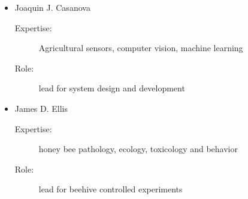 
\begin{itemize}
\item Joaquin J. Casanova
\begin{description}
\item[Expertise:] Agricultural sensors, computer vision, machine learning
\item[Role:] lead for system design and development
\end{description}
\item James D. Ellis
\begin{description}
\item[Expertise:] honey bee pathology, ecology, toxicology and behavior
\item[Role:] lead for beehive controlled experiments
\end{description}
\end{itemize}
